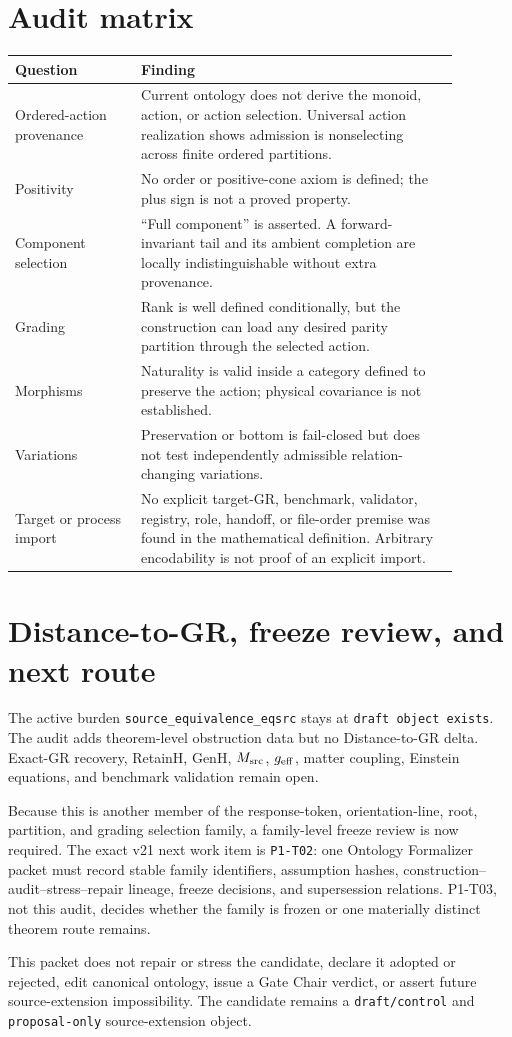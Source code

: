 \documentclass[11pt]{article}
\begin{document}
\section{Audit matrix}

\begin{center}
\begin{tabular}{p{0.25\linewidth}p{0.63\linewidth}}
\toprule
Question & Finding \\
\midrule
Ordered-action provenance & Current ontology does not derive the monoid,
action, or action selection. Universal action realization shows admission is
nonselecting across finite ordered partitions. \\
Positivity & No order or positive-cone axiom is defined; the plus sign is
not a proved property. \\
Component selection & ``Full component'' is asserted. A forward-invariant
tail and its ambient completion are locally indistinguishable without extra
provenance. \\
Grading & Rank is well defined conditionally, but the construction can load
any desired parity partition through the selected action. \\
Morphisms & Naturality is valid inside a category defined to preserve the
action; physical covariance is not established. \\
Variations & Preservation or bottom is fail-closed but does not test
independently admissible relation-changing variations. \\
Target or process import & No explicit target-GR, benchmark, validator,
registry, role, handoff, or file-order premise was found in the mathematical
definition. Arbitrary encodability is not proof of an explicit import. \\
\bottomrule
\end{tabular}
\end{center}

\section{Distance-to-GR, freeze review, and next route}

The active burden \texttt{source\_equivalence\_eqsrc} stays at
\texttt{draft object exists}. The audit adds theorem-level obstruction data
but no Distance-to-GR delta. Exact-GR recovery, RetainH, GenH,
\(M_{\rm src}\), \(g_{\rm eff}\), matter coupling, Einstein equations, and
benchmark validation remain open.

Because this is another member of the response-token, orientation-line,
root, partition, and grading selection family, a family-level freeze review
is now required. The exact v21 next work item is \texttt{P1-T02}: one
Ontology Formalizer packet must record stable family identifiers, assumption
hashes, construction--audit--stress--repair lineage, freeze decisions, and
supersession relations. P1-T03, not this audit, decides whether the family is
frozen or one materially distinct theorem route remains.

This packet does not repair or stress the candidate, declare it adopted or
rejected, edit canonical ontology, issue a Gate Chair verdict, or assert
future source-extension impossibility. The candidate remains a
\texttt{draft/control} and \texttt{proposal-only} source-extension object.
\end{document}

